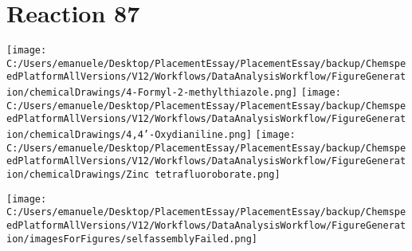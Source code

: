 \documentclass{article}%
\begin{document}
\section*{Reaction 87}%
%
\begin{scheme}[H]%
\begin{minipage}{0.5\textwidth}%
\texttt{[image: C:/Users/emanuele/Desktop/PlacementEssay/PlacementEssay/backup/ChemspeedPlatformAllVersions/V12/Workflows/DataAnalysisWorkflow/FigureGeneration/chemicalDrawings/4-Formyl-2-methylthiazole.png]}%
\texttt{[image: C:/Users/emanuele/Desktop/PlacementEssay/PlacementEssay/backup/ChemspeedPlatformAllVersions/V12/Workflows/DataAnalysisWorkflow/FigureGeneration/chemicalDrawings/4,4'-Oxydianiline.png]}%
\texttt{[image: C:/Users/emanuele/Desktop/PlacementEssay/PlacementEssay/backup/ChemspeedPlatformAllVersions/V12/Workflows/DataAnalysisWorkflow/FigureGeneration/chemicalDrawings/Zinc tetrafluoroborate.png]}%
\end{minipage}%
\begin{minipage}{0.5\textwidth}%
\begin{center}%
\texttt{[image: C:/Users/emanuele/Desktop/PlacementEssay/PlacementEssay/backup/ChemspeedPlatformAllVersions/V12/Workflows/DataAnalysisWorkflow/FigureGeneration/imagesForFigures/selfassemblyFailed.png]}%
\end{center}%
\end{minipage}%
\caption{Self-assembly of components 1, 15, with Zinc(II) in a 3.0:1.5:1.0 molar ratio in CH$_3$CN at 60\textdegree C for 40h. These are the reagents (starting materials) for reaction 87.}%
\end{scheme}%
\end{document}

